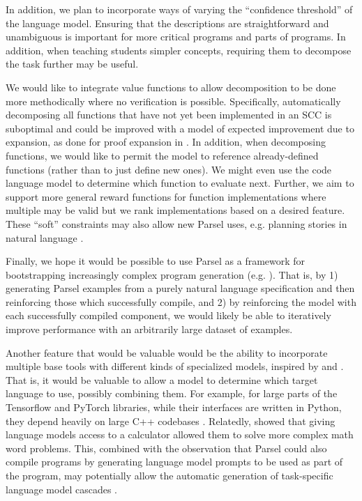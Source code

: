 In addition, we plan to incorporate ways of varying the ``confidence threshold'' of the language model. Ensuring that the descriptions are straightforward and unambiguous is important for more critical programs and parts of programs. In addition, when teaching students simpler concepts, requiring them to decompose the task further may be useful.

We would like to integrate value functions to allow decomposition to be done more methodically where no verification is possible. Specifically, automatically decomposing all functions that have not yet been implemented in an SCC is suboptimal and could be improved with a model of expected improvement due to expansion, as done for proof expansion in \citet{polu2020generative}. In addition, when decomposing functions, we would like to permit the model to reference already-defined functions (rather than to just define new ones). We might even use the code language model to determine which function to evaluate next.
Further, we aim to support more general reward functions for function implementations where multiple may be valid but we rank implementations based on a desired feature. These ``soft'' constraints may also allow new Parsel uses, e.g. planning stories in natural language \citep{anbang2022neural}.

Finally, we hope it would be possible to use Parsel as a framework for bootstrapping increasingly complex program generation (e.g. \citet{anthony2017thinking,zelikman2022star,odena2020bustle}). That is, by 1) generating Parsel examples from a purely natural language specification and then reinforcing those which successfully compile, and 2) by reinforcing the model with each successfully compiled component, we would likely be able to iteratively improve performance with an arbitrarily large dataset of examples.

Another feature that would be valuable would be the ability to incorporate multiple base tools with different kinds of specialized models, inspired by \citet{ibarz2022generalist} and \citet{dohan2022language}. That is, it would be valuable to allow a model to determine which target language to use, possibly combining them. For example, for large parts of the Tensorflow and PyTorch libraries, while their interfaces are written in Python, they depend heavily on large C++ codebases \citep{paszke2019pytorch,tensorflow2015-whitepaper}. Relatedly, \citet{cobbe2021training} showed that giving language models access to a calculator allowed them to solve more complex math word problems. This, combined with the observation that Parsel could also compile programs by generating language model prompts to be used as part of the program, may potentially allow the automatic generation of task-specific language model cascades \citep{dohan2022language}.

